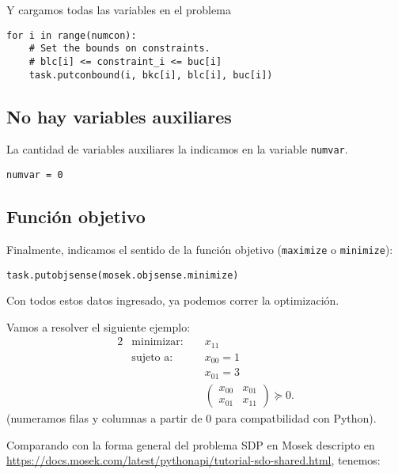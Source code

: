 \documentclass[11pt]{article}
\begin{document}
Y cargamos todas las variables en el problema
\begin{lstlisting}
for i in range(numcon):
    # Set the bounds on constraints.
    # blc[i] <= constraint_i <= buc[i]
    task.putconbound(i, bkc[i], blc[i], buc[i])
\end{lstlisting}    

\subsection{No hay variables auxiliares}

La cantidad de variables auxiliares la indicamos en la variable \texttt{numvar}.

\begin{lstlisting}
numvar = 0
\end{lstlisting}

    
\subsection{Función objetivo}

Finalmente, indicamos el sentido de la función objetivo (\texttt{maximize} o \texttt{minimize}):
\begin{lstlisting}
task.putobjsense(mosek.objsense.minimize)
\end{lstlisting}

Con todos estos datos ingresado, ya podemos correr la optimización.





Vamos a resolver el siguiente ejemplo:
\begin{alignat*}{2}
  & \text{minimizar: } & & x_{11} \\
  & \text{sujeto a: } & & x_{00} = 1 \\
  & & & x_{01} = 3 \\
  & & & \begin{pmatrix} x_{00} & x_{01} \\ x_{01} & x_{11} \end{pmatrix} \succeq 0.
\end{alignat*}
(numeramos filas y columnas a partir de 0 para compatbilidad con Python).

Comparando con la forma general del problema SDP en Mosek descripto en \url{https://docs.mosek.com/latest/pythonapi/tutorial-sdo-shared.html}, tenemos:
\end{document}
